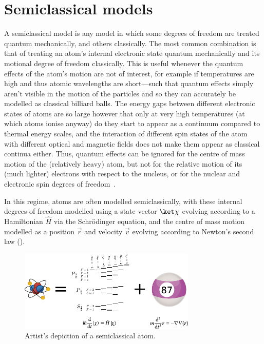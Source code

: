 \section{Semiclassical models}\label{sec:semiclassical_methods}

A semiclassical model is any model in which some degrees of freedom are treated quantum mechanically, and others classically. The most common combination is that of treating an atom's internal electronic state quantum mechanically and its motional degree of freedom classically. This is useful whenever the quantum effects of the atom's motion are not of interest, for example if temperatures are high and thus atomic wavelengths are short---such that quantum effects simply aren't visible in the motion of the particles and so they can accurately be modelled as classical billiard balls. The energy gaps between different electronic states of atoms are so large however that only at very high temperatures (at which atoms ionise anyway) do they start to appear as a continuum compared to thermal energy scales, and the interaction of different spin states of the atom with different optical and magnetic fields does not make them appear as classical continua either. Thus, quantum effects can be ignored for the centre of mass motion of the (relatively heavy) atom, but not for the relative motion of its (much lighter) electrons with respect to the nucleus, or for the nuclear and electronic spin degrees of freedom~\cite{doi:10.1063/1.459170}.

In this regime, atoms are often modelled semiclassically, with these internal degrees of freedom modelled using a state vector $\ket\chi$ evolving according to a Hamiltonian $\hat H$ via the Schr\"odinger equation, and the centre of mass motion modelled as a position $\vec r$ and velocity $\vec v$ evolving according to Newton's second law ().

\begin{figure}[t]
    \centerfloat
    \includegraphics[width=0.75\textwidth]{figures/hidden_variables/semiclassical.pdf}
    \caption{Artist's depiction of a semiclassical atom.}
    \label{fig:semiclassical}
\end{figure}

